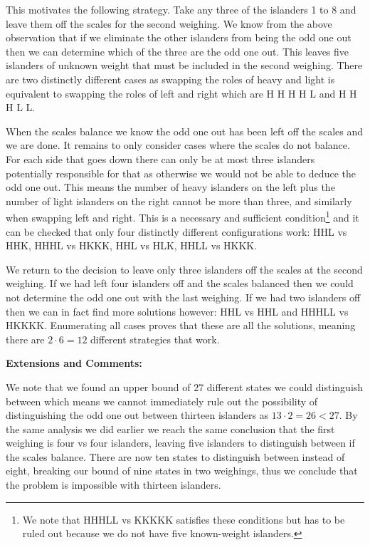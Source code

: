 This motivates the following strategy. Take any three of the islanders 1 to 8 and leave them off the scales for the second weighing. We know from the above observation that if we eliminate the other islanders from being the odd one out then we can determine which of the three are the odd one out. This leaves five islanders of unknown weight that must be included in the second weighing. There are two distinctly different cases as swapping the roles of heavy and light is equivalent to swapping the roles of left and right which are H H H H L and H H H L L.

When the scales balance we know the odd one out has been left off the scales and we are done. It remains to only consider cases where the scales do not balance. For each side that goes down there can only be at most three islanders potentially responsible for that as otherwise we would not be able to deduce the odd one out. This means the number of heavy islanders on the left plus the number of light islanders on the right cannot be more than three, and similarly when swapping left and right. This is a necessary and sufficient condition\footnote{We note that HHHLL vs KKKKK satisfies these conditions but has to be ruled out because we do not have five known-weight islanders.} and it can be checked that only four distinctly different configurations work: HHL vs HHK, HHHL vs HKKK, HHL vs HLK, HHLL vs HKKK.

We return to the decision to leave only three islanders off the scales at the second weighing. If we had left four islanders off and the scales balanced then we could not determine the odd one out with the last weighing. If we had two islanders off then we can in fact find more solutions however: HHL vs HHL and HHHLL vs HKKKK. Enumerating all cases proves that these are all the solutions, meaning there are $2 \cdot 6 = 12$ different strategies that work.

\textbf{Extensions and Comments:}

We note that we found an upper bound of 27 different states we could distinguish between which means we cannot immediately rule out the possibility of distinguishing the odd one out between thirteen islanders as $13 \cdot 2 = 26 < 27$. By the same analysis we did earlier we reach the same conclusion that the first weighing is four vs four islanders, leaving five islanders to distinguish between if the scales balance. There are now ten states to distinguish between instead of eight, breaking our bound of nine states in two weighings, thus we conclude that the problem is impossible with thirteen islanders.